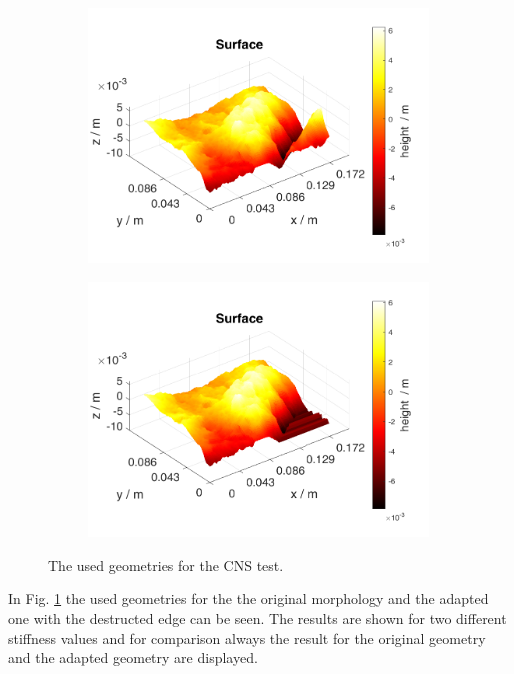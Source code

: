 \begin{figure}
\begin{subfigure}[c]{0.48\textwidth}
\includegraphics[width=0.99\textwidth]{./figures/MEX3-2_SurfaceOrig.png}
\end{subfigure}
\begin{subfigure}[c]{0.48\textwidth}
\includegraphics[width=0.99\textwidth]{./figures/MEX3-2_SurfaceWithout.png}
\end{subfigure}
\caption{The used geometries for the CNS test.}
\label{fig:MEX3-2_Surface}
\end{figure}

In Fig. \ref{fig:MEX3-2_Surface} the used geometries for the the original morphology and the adapted one with the destructed edge can be seen. The results are shown for two different stiffness values and for comparison always the result for the original geometry and the adapted geometry are displayed.

